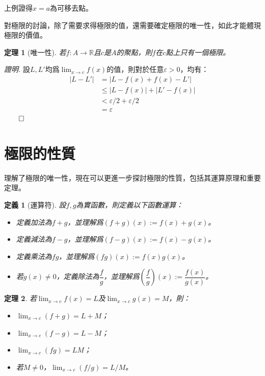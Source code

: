 \documentclass[12pt]{article}
\newtheorem{definition}{定義}
\newtheorem*{theorem}{定理}
\renewenvironment*{proof}{\textit{證明.}}{\hfill$\qed$}
\begin{document}
    上例證得$x=a$為可移去點。

    對極限的討論，除了需要求得極限的值，還需要確定極限的唯一性，如此才能體現極限的價值。

    \begin{theorem}[唯一性]
        若$f:A\to\mathbb{R}$且$c$是$A$的聚點，則$f$在$c$點上只有一個極限。
    \end{theorem}

    \begin{proof}
        設$L,L'$均爲$\lim_{x\to c}f(x)$的值，則對於任意$\varepsilon>0$，均有：\begin{align*}
            |L-L'|&=|L-f(x)+f(x)-L'|\\
            &\leq|L-f(x)|+|L'-f(x)|\\
            &<\varepsilon/2+\varepsilon/2\\
            &=\varepsilon
        \end{align*}
    \end{proof}

    \section*{極限的性質}

    理解了極限的唯一性，現在可以更進一步探討極限的性質，包括其運算原理和重要定理。

    \begin{definition}[運算符]
        設$f,g$為實函數，則定義以下函數運算：\begin{itemize}
            \item 定義加法為$f+g$，並理解爲$(f+g)(x):=f(x)+g(x)$。
            \item 定義減法為$f-g$，並理解爲$(f-g)(x):=f(x)-g(x)$。
            \item 定義乘法為$fg$，並理解爲$(fg)(x):=f(x)g(x)$。
            \item 若$g(x)\neq 0$，定義除法為$\dfrac{f}{g}$，並理解爲$(\dfrac{f}{g})(x):=\dfrac{f(x)}{g(x)}$。
        \end{itemize}
    \end{definition}

    \begin{theorem}
        若$\lim_{x\to c}f(x)=L$及$\lim_{x\to c}g(x)=M$，則：\begin{itemize}
            \item $\lim_{x\to c}(f+g)=L+M$；
            \item $\lim_{x\to c}(f-g)=L-M$；
            \item $\lim_{x\to c}(fg)=LM$；
            \item 若$M\neq 0$，$\lim_{x\to c}(f/g)=L/M$。
        \end{itemize}
    \end{theorem}
\end{document}
